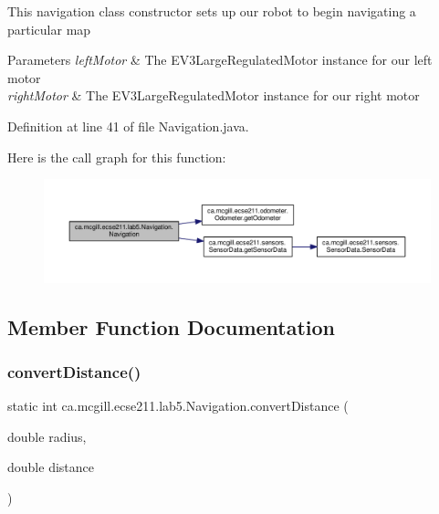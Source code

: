 This navigation class constructor sets up our robot to begin navigating a particular map


\begin{DoxyParams}{Parameters}
{\em left\+Motor} & The E\+V3\+Large\+Regulated\+Motor instance for our left motor \\
\hline
{\em right\+Motor} & The E\+V3\+Large\+Regulated\+Motor instance for our right motor \\
\hline
\end{DoxyParams}


Definition at line 41 of file Navigation.\+java.

Here is the call graph for this function\+:
\nopagebreak
\begin{figure}[H]
\begin{center}
\leavevmode
\includegraphics[width=350pt]{classca_1_1mcgill_1_1ecse211_1_1lab5_1_1_navigation_a93b746f61226c3b14532c43d0c2f61dd_cgraph}
\end{center}
\end{figure}


\subsection{Member Function Documentation}
\mbox{\label{classca_1_1mcgill_1_1ecse211_1_1lab5_1_1_navigation_a85122ad723d0988c118866f367073be6}} 
\subsubsection{\texorpdfstring{convert\+Distance()}{convertDistance()}}
{\footnotesize\ttfamily static int ca.\+mcgill.\+ecse211.\+lab5.\+Navigation.\+convert\+Distance (\begin{DoxyParamCaption}\item[{double}]{radius,  }\item[{double}]{distance }\end{DoxyParamCaption})\hspace{0.3cm}{\ttfamily [static]}}


